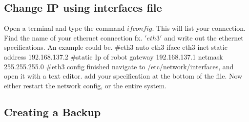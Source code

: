 \documentclass{article}
\begin{document}
\subsection{Change IP using interfaces file}
Open a terminal and type the command $ifconfig$. 
This will list your connection. Find the name of your ethernet connection fx. $'eth3'$ and write out the ethernet specifications. An example could be. 
\#eth3
auto eth3 
iface eth3 inet static 
address 192.168.137.2 \#static Ip of robot
gateway 192.168.137.1 
netmask 255.255.255.0  
\#eth3 config finished
navigate to /etc/network/interfaces, and open it with a text editor. 
add your specification at the bottom of the file.
Now either restart the network config, or the entire system.

\subsection{Creating a Backup}
\end{document}
